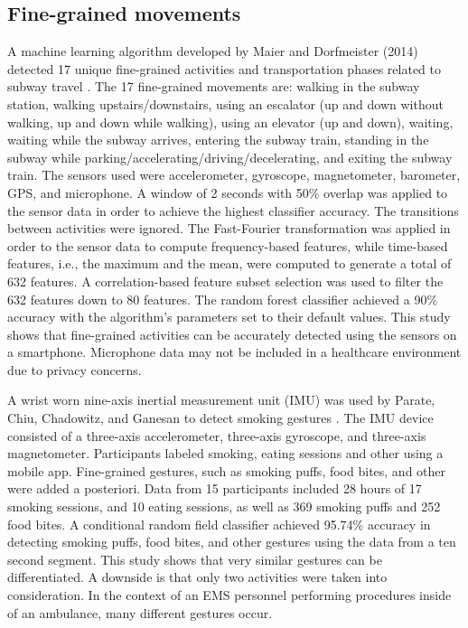 \subsection{Fine-grained movements}
A machine learning algorithm developed by Maier and Dorfmeister (2014) detected 17 unique fine-grained activities and transportation phases related to subway travel \cite{Dorfmeister2014}. The 17 fine-grained movements are: walking in the subway station, walking upstairs/downstairs, using an escalator (up and down without walking, up and down while walking), using an elevator (up and down), waiting, waiting while the subway arrives, entering the subway train, standing in the subway while parking/accelerating/driving/decelerating, and exiting the subway train. The sensors used were accelerometer, gyroscope, magnetometer, barometer, GPS, and microphone. A window of 2 seconds with 50\% overlap was applied to the sensor data in order to achieve the highest classifier accuracy. The transitions between activities were ignored. The Fast-Fourier transformation was applied in order to the sensor data to compute frequency-based features, while time-based features, i.e., the maximum and the mean, were computed to generate a total of 632 features. A correlation-based feature subset selection was used to filter the 632 features down to 80 features. The random forest classifier achieved a 90\% accuracy with the algorithm's parameters set to their default values. This study shows that fine-grained activities can be accurately detected using the sensors on a smartphone. Microphone data may not be included in a healthcare environment due to privacy concerns.
\par A wrist worn nine-axis inertial measurement unit (IMU) was used by Parate, Chiu, Chadowitz, and Ganesan to detect smoking gestures \cite{Parate2014}. The IMU device consisted of a three-axis accelerometer, three-axis gyroscope, and three-axis magnetometer. Participants labeled smoking, eating sessions and other using a mobile app. Fine-grained gestures, such as smoking puffs, food bites, and other were added a posteriori. Data from 15 participants included 28 hours of 17 smoking sessions, and 10 eating sessions, as well as 369 smoking puffs and 252 food bites. A conditional random field classifier achieved 95.74\% accuracy in detecting smoking puffs, food bites, and other gestures using the data from a ten second segment. This study shows that very similar gestures can be differentiated. A downside is that only two activities were taken into consideration. In the context of an EMS personnel performing procedures inside of an ambulance, many different gestures occur.
